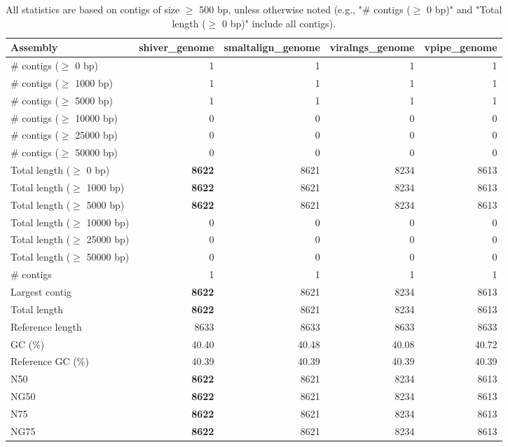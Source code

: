 \documentclass[12pt,a4paper]{article}
\begin{document}
\begin{table}[ht]
\begin{center}
\caption{All statistics are based on contigs of size $\geq$ 500 bp, unless otherwise noted (e.g., "\# contigs ($\geq$ 0 bp)" and "Total length ($\geq$ 0 bp)" include all contigs).}
\begin{tabular}{|l*{4}{|r}|}
\hline
Assembly & shiver\_genome & smaltalign\_genome & viralngs\_genome & vpipe\_genome \\ \hline
\# contigs ($\geq$ 0 bp) & 1 & 1 & 1 & 1 \\ \hline
\# contigs ($\geq$ 1000 bp) & 1 & 1 & 1 & 1 \\ \hline
\# contigs ($\geq$ 5000 bp) & 1 & 1 & 1 & 1 \\ \hline
\# contigs ($\geq$ 10000 bp) & 0 & 0 & 0 & 0 \\ \hline
\# contigs ($\geq$ 25000 bp) & 0 & 0 & 0 & 0 \\ \hline
\# contigs ($\geq$ 50000 bp) & 0 & 0 & 0 & 0 \\ \hline
Total length ($\geq$ 0 bp) & {\bf 8622} & 8621 & 8234 & 8613 \\ \hline
Total length ($\geq$ 1000 bp) & {\bf 8622} & 8621 & 8234 & 8613 \\ \hline
Total length ($\geq$ 5000 bp) & {\bf 8622} & 8621 & 8234 & 8613 \\ \hline
Total length ($\geq$ 10000 bp) & 0 & 0 & 0 & 0 \\ \hline
Total length ($\geq$ 25000 bp) & 0 & 0 & 0 & 0 \\ \hline
Total length ($\geq$ 50000 bp) & 0 & 0 & 0 & 0 \\ \hline
\# contigs & 1 & 1 & 1 & 1 \\ \hline
Largest contig & {\bf 8622} & 8621 & 8234 & 8613 \\ \hline
Total length & {\bf 8622} & 8621 & 8234 & 8613 \\ \hline
Reference length & 8633 & 8633 & 8633 & 8633 \\ \hline
GC (\%) & 40.40 & 40.48 & 40.08 & 40.72 \\ \hline
Reference GC (\%) & 40.39 & 40.39 & 40.39 & 40.39 \\ \hline
N50 & {\bf 8622} & 8621 & 8234 & 8613 \\ \hline
NG50 & {\bf 8622} & 8621 & 8234 & 8613 \\ \hline
N75 & {\bf 8622} & 8621 & 8234 & 8613 \\ \hline
NG75 & {\bf 8622} & 8621 & 8234 & 8613 \\ \hline

\end{tabular}
\end{center}
\end{table}
\end{document}
